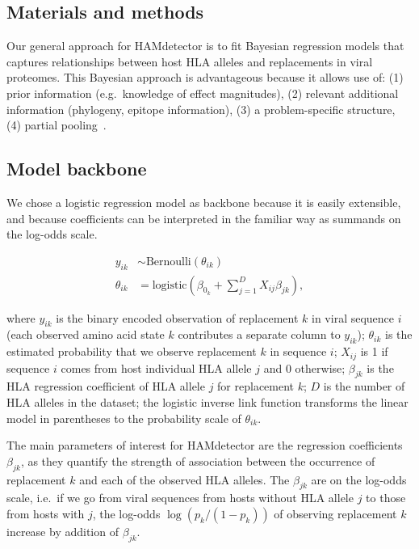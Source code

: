\documentclass{bioinfo}
\begin{document}
\begin{methods}
  \section{Materials and methods}

  Our general approach for HAMdetector is to fit Bayesian regression models that captures relationships between host HLA alleles and replacements in viral proteomes. This Bayesian approach is advantageous because it allows use of: (1) prior information (e.g.\ knowledge of effect magnitudes), (2) relevant additional information (phylogeny, epitope information), (3) a problem-specific structure, (4) partial pooling~\citep{Gelman2010}.
  
\subsection{Model backbone}

We chose a logistic regression model as backbone because it is easily extensible, and because coefficients can be interpreted in the familiar way as summands on the log-odds scale.

\begin{align}
\label{eq:backbone}
  y_{ik} & \sim \text{Bernoulli}(\theta_{ik}) \\
  \theta_{ik} & = \text{logistic}\left(\beta_{0_{k}} + \sum_{j=1}^{D} X_{ij}\beta_{jk}\right),
\end{align}

where \(y_{ik}\) is the binary encoded observation of replacement $k$ in viral sequence $i$ (each observed amino acid state $k$ contributes a separate column to $y_{ik}$); \(\theta_{ik}\) is the estimated probability that we observe replacement \(k\) in sequence \(i\); \(X_{ij}\) is 1 if sequence \(i\) comes from host individual HLA allele \(j\) and 0 otherwise; $\beta_{jk}$ is the HLA regression coefficient of HLA allele \(j\) for replacement \(k\); \(D\) is the number of HLA alleles in the dataset; the logistic inverse link function transforms the linear model in parentheses to the probability scale of $\theta_{ik}$.

The main parameters of interest for HAMdetector are the regression coefficients $\beta_{jk}$, as they quantify the strength of association between the occurrence of replacement \(k\) and each of the observed HLA alleles. The $\beta_{jk}$ are on the log-odds scale, i.e.\ if we go from viral sequences from hosts without HLA allele $j$ to those from hosts with $j$, the log-odds $\log (p_k/(1-p_k))$ of observing replacement \(k\) increase by addition of $\beta_{jk}$.


\end{methods}
\end{document}
